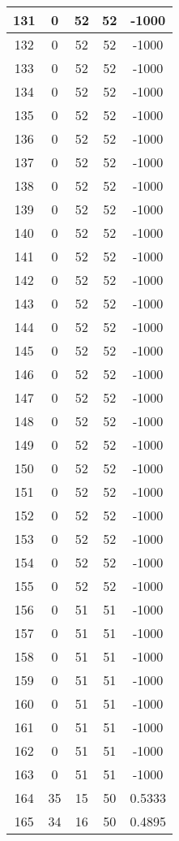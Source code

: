\documentclass[letterpaper, 12pt]{article}
\begin{document}
\begin{longtable}{|c|c|c|c|c|}
\hline
131 & 0 & 52 & 52 & -1000 \\
\hline
132 & 0 & 52 & 52 & -1000 \\
\hline
133 & 0 & 52 & 52 & -1000 \\
\hline
134 & 0 & 52 & 52 & -1000 \\
\hline
135 & 0 & 52 & 52 & -1000 \\
\hline
136 & 0 & 52 & 52 & -1000 \\
\hline
137 & 0 & 52 & 52 & -1000 \\
\hline
138 & 0 & 52 & 52 & -1000 \\
\hline
139 & 0 & 52 & 52 & -1000 \\
\hline
140 & 0 & 52 & 52 & -1000 \\
\hline
141 & 0 & 52 & 52 & -1000 \\
\hline
142 & 0 & 52 & 52 & -1000 \\
\hline
143 & 0 & 52 & 52 & -1000 \\
\hline
144 & 0 & 52 & 52 & -1000 \\
\hline
145 & 0 & 52 & 52 & -1000 \\
\hline
146 & 0 & 52 & 52 & -1000 \\
\hline
147 & 0 & 52 & 52 & -1000 \\
\hline
148 & 0 & 52 & 52 & -1000 \\
\hline
149 & 0 & 52 & 52 & -1000 \\
\hline
150 & 0 & 52 & 52 & -1000 \\
\hline
151 & 0 & 52 & 52 & -1000 \\
\hline
152 & 0 & 52 & 52 & -1000 \\
\hline
153 & 0 & 52 & 52 & -1000 \\
\hline
154 & 0 & 52 & 52 & -1000 \\
\hline
155 & 0 & 52 & 52 & -1000 \\
\hline
156 & 0 & 51 & 51 & -1000 \\
\hline
157 & 0 & 51 & 51 & -1000 \\
\hline
158 & 0 & 51 & 51 & -1000 \\
\hline
159 & 0 & 51 & 51 & -1000 \\
\hline
160 & 0 & 51 & 51 & -1000 \\
\hline
161 & 0 & 51 & 51 & -1000 \\
\hline
162 & 0 & 51 & 51 & -1000 \\
\hline
163 & 0 & 51 & 51 & -1000 \\
\hline
164 & 35 & 15 & 50 & 0.5333 \\
\hline
165 & 34 & 16 & 50 & 0.4895 \\

\end{longtable}
\end{document}

